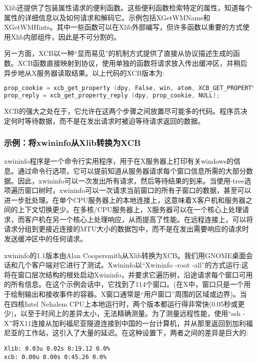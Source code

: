 Xlib还提供了包装属性请求的便利函数。这些便利函数检索特定的属性，知道每个属性的详细信息以及如何请求和解码它。示例包括XGetWMName和XGetWMHints。其中一些函数可以在Xlib外部编写，但许多函数以重要的方式使用Xlib内部组件，因此是不可分割的。

另一方面，XCB以一种“显而易见”的机制方式提供了直接从协议描述生成的函数。XCB函数直接映射到协议，使用单独的函数将请求放入传出缓冲区，并稍后异步地从X服务器读取结果。以上代码的XCB版本为:
\begin{lstlisting}[language=C]
prop_cookie = xcb_get_property (dpy, False, win, atom, XCB_GET_PROPERTY_TYPE_ANY, 0, 0);
prop_reply = xcb_get_property_reply (dpy, prop_cookie, NULL);
\end{lstlisting}

\noindent XCB的强大之处在于，它允许在这两个步骤之间放置尽可能多的代码。程序员决定何时等待数据，而不是在发出请求时被迫等待请求返回的数据。

\subsubsection{示例：将xwininfo从Xlib转换为XCB}

xwininfo程序是一个命令行实用程序，用于在X服务器上打印有关windows的信息。通过命令行选项，它可以提前知道从服务器请求每个窗口信息所需的大部分数据。因此，xwininfo可以一次发出所有请求，然后等待结果的到来。当使用-tree选项遍历窗口树时，xwininfo可以一次请求当前窗口的所有子窗口的数据，甚至可以进一步批处理。在单个CPU服务器上的本地连接上，这意味着X客户机和服务器之间的上下文切换更少。在多核/CPU服务器上，X服务器可以在一个核心上处理请求，而客户机在另一个核心上处理响应，从而提高了性能。在远程连接上，可以将请求分组到更接近连接的MTU大小的数据包中，而不是在发出需要响应的请求时发送缓冲区中的任何请求。

xwininfo的1.1版本由Alan Coopersmith从Xlib转换为XCB。我们用GNOME桌面会话和几个客户端对它进行了测试。Xwininfo以“Xwininfo -root -all”的方式运行:这将在窗口层次结构的根处启动Xwininfo，并要求它遍历树，沿途请求每个窗口可用的所有信息。在这个示例会话中，它找到了114个窗口。(在X中，窗口只是一个用于绘制输出和接收事件的容器。X窗口通常是“用户窗口”周围的区域或边界)。当在四核Intel Nehalem CPU上本地运行时，两个版本都运行得非常快(0.05秒或更少)，以至于时间上的差异太小，无法精确测量。为了测量远程性能，使用“ssh -X”将X11连接从加利福尼亚隧道连接到中国的一台计算机，并从那里返回到加利福尼亚的工作站，这引入了大量的延迟。在这种设置下，两者之间的差异是巨大的:
\begin{lstlisting}
Xlib: 0.03u 0.02s 8:19.12 0.0% 
xcb: 0.00u 0.00s 0:45.26 0.0% 
\end{lstlisting}

